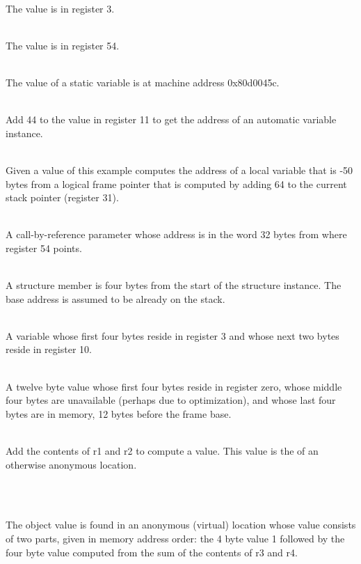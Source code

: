 \newcommand{\descriptionitemnl}[1]
        {\vspace{0.5\baselineskip}\item[#1]\mbox{}\\\vspace{0.5\baselineskip}}
\begin{description}
\descriptionitemnl{\DWOPregthree}
The value is in register 3.

\descriptionitemnl{\DWOPregx{} 54}
The value is in register 54.

\descriptionitemnl{\DWOPaddr{} 0x80d0045c}
The value of a static variable is at machine address 0x80d0045c.

\descriptionitemnl{\DWOPbregeleven{} 44}
Add 44 to the value in register 11 to get the address of an automatic
variable instance.

\descriptionitemnl{\DWOPfbreg{} -50}
Given a \DWATframebase{} value of
 this example
computes the address of a local variable that is -50 bytes from a
logical frame pointer that is computed by adding 64 to the current
stack pointer (register 31).

\descriptionitemnl{\DWOPbregx{} 54 32 \DWOPderef}
A call-by-reference parameter whose address is in the word 32 bytes
from where register 54 points.

\descriptionitemnl{\DWOPplusuconst{} 4}
A structure member is four bytes from the start of the structure
instance. The base address is assumed to be already on the stack.

\descriptionitemnl{\DWOPregthree{} \DWOPpiece{} 4 \DWOPregten{} \DWOPpiece{} 2}
A variable whose first four bytes reside in register 3 and whose next
two bytes reside in register 10.

\descriptionitemnl{\DWOPregzero{} \DWOPpiece{} 4 \DWOPpiece{} 4 \DWOPfbreg{} -12 \DWOPpiece{} 4}
\vspace{-2\parsep}A twelve byte value whose first four bytes reside in register zero,
whose middle four bytes are unavailable (perhaps due to optimization),
and whose last four bytes are in memory, 12 bytes before the frame
base.

\descriptionitemnl{\DWOPbregone{} 0 \DWOPbregtwo{} 0 \DWOPplus{} \DWOPstackvalue{} }
Add the contents of r1 and r2 to compute a value. This value is the
 of an otherwise anonymous location.

\descriptionitemnl{\DWOPlitone{} \DWOPstackvalue{} \DWOPpiece{} 4 \DWOPbregthree{} 0 \DWOPbregfour{} 0}
\vspace{-3\parsep}\descriptionitemnl{
\hspace{0.5cm}\DWOPplus{} \DWOPstackvalue{} \DWOPpiece{} 4 }
The object value is found in an anonymous (virtual) location whose
value consists of two parts, given in memory address order: the 4 byte
value 1 followed by the four byte value computed from the sum of the
contents of r3 and r4.


\end{description}
